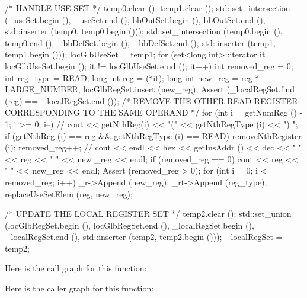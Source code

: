 \begin{DoxyCode}
{    /* HANDLE USE SET */
    temp0.clear ();
    temp1.clear ();
    std::set_intersection (_useSet.begin (), _useSet.end (),
                           bbOutSet.begin (), bbOutSet.end (),
                           std::inserter (temp0, temp0.begin ()));
    std::set_intersection (temp0.begin (), temp0.end (),
                           _bbDefSet.begin (), _bbDefSet.end (), 
                           std::inserter (temp1, temp1.begin ()));
    locGlbUseSet = temp1;
    for (set<long int>::iterator it = locGlbUseSet.begin (); it != locGlbUseSet.e
      nd (); it++) {
        int removed_reg = 0;
        int reg_type = READ;
        long int reg = (*it);
        long int new_reg = reg * LARGE_NUMBER;
        locGlbRegSet.insert (new_reg);
        Assert (_localRegSet.find (reg) == _localRegSet.end ());
        /* REMOVE THE OTHER READ REGISTER CORRESPONDING TO THE SAME OPERAND */
        for (int i = getNumReg () - 1; i >= 0; i--) {
//            cout << getNthReg(i) << "(" << getNthRegType (i) << ") ";
            if (getNthReg (i) == reg && getNthRegType (i) == READ) {
                removeNthRegister (i);
                removed_reg++;
            }
        }
//        cout << endl << hex << getInsAddr () << dec << " " << reg << " " << new
      _reg << endl;
        if (removed_reg == 0) cout << reg << " " << new_reg << endl;
        Assert (removed_reg > 0);
        for (int i = 0; i < removed_reg; i++) {
            _r->Append (new_reg);
            _rt->Append (reg_type);
        }
        replaceUseSetElem (reg, new_reg);
    }

    /* UPDATE THE LOCAL REGISTER SET */
    temp2.clear ();
    std::set_union (locGlbRegSet.begin (), locGlbRegSet.end (),
                    _localRegSet.begin (), _localRegSet.end (),
                    std::inserter (temp2, temp2.begin ()));
    _localRegSet = temp2;
}
\end{DoxyCode}


Here is the call graph for this function:




Here is the caller graph for this function:


